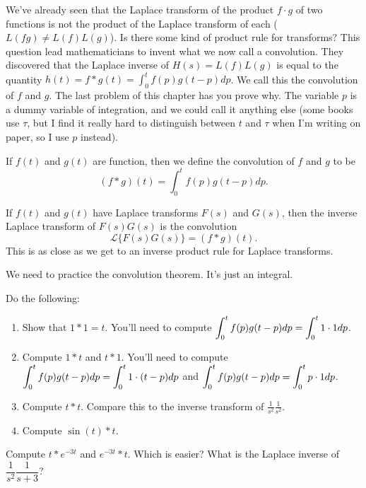 We've already seen that the Laplace transform of the product $f\cdot g$ of two functions is not the product of the Laplace transform of each ($L(fg)\neq L(f)L(g)$). Is there some kind of product rule for transforms?  This question lead mathematicians to invent what we now call a convolution.  They discovered that the Laplace inverse of $H(s) = L(f)L(g)$ is equal to the quantity $h(t) = f * g (t) = \int_0^t f(p)g(t-p)dp$. We call this the convolution of $f$ and $g$. The last problem of this chapter has you prove why. The variable $p$ is a dummy variable of integration, and we could call it anything else (some books use $\tau$, but I find it really hard to distinguish between $t$ and $\tau$ when I'm writing on paper, so I use $p$ instead). 
\begin{definition}[Convolutions]
 If $f(t)$ and $g(t)$ are function, then we define the convolution of $f$ and $g$ to be 
$$ (f * g) (t) = \int_0^t f(p)g(t-p)dp.$$
\end{definition}
\begin{theorem}\label{the convolution theorem}
 If $f(t)$ and $g(t)$ have Laplace transforms $F(s)$ and $G(s)$, then the inverse Laplace transform of $F(s)G(s)$ is the convolution
$$\mathscr{L}\{F(s)G(s)\} = (f * g)(t).$$
This is as close as we get to an inverse product rule for Laplace transforms. 
\end{theorem}

We need to practice the convolution theorem.  It's just an integral.
\begin{problem}
Do the following:
\begin{enumerate}
 \item Show that $1*1 = t$. You'll need to compute $\displaystyle \int_0^t f(p)g(t-p)dp = \int_0^t 1\cdot 1 dp$. 
 \item Compute $1*t$ and $t*1$. You'll need to compute $\displaystyle \int_0^t f(p)g(t-p)dp = \int_0^t 1\cdot (t-p) dp$ and $\displaystyle \int_0^t f(p)g(t-p)dp = \int_0^t p\cdot 1 dp$. 
 \item Compute $t*t$. Compare this to the inverse transform of $\frac{1}{s^2}\frac{1}{s^2}$.
 \item Compute $\sin(t)*t$. 
\end{enumerate}
\end{problem}

\begin{problem}
Compute $t*e^{-3t}$ and $e^{-3t}*t$. Which is easier? What is the Laplace inverse of $\dfrac{1}{s^2}\dfrac{1}{s+3}$?
\end{problem}


